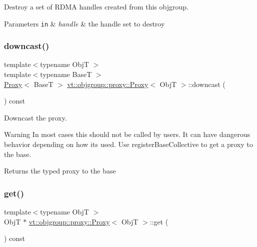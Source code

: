 Destroy a set of R\+D\+MA handles created from this objgroup. 


\begin{DoxyParams}[1]{Parameters}
\mbox{\tt in}  & {\em handle} & the handle set to destroy \\
\hline
\end{DoxyParams}
\mbox{\label{structvt_1_1objgroup_1_1proxy_1_1_proxy_ae672794dc83491200d7f6e794865a6bc}} 
\subsubsection{\texorpdfstring{downcast()}{downcast()}}
{\footnotesize\ttfamily template$<$typename ObjT $>$ \\
template$<$typename BaseT $>$ \\
\hyperlink{structvt_1_1objgroup_1_1proxy_1_1_proxy}{Proxy}$<$ BaseT $>$ \hyperlink{structvt_1_1objgroup_1_1proxy_1_1_proxy}{vt\+::objgroup\+::proxy\+::\+Proxy}$<$ ObjT $>$\+::downcast (\begin{DoxyParamCaption}{ }\end{DoxyParamCaption}) const}



Downcast the proxy. 

\begin{DoxyWarning}{Warning}
In most cases this should not be called by users. It can have dangerous behavior depending on how its used. Use {\ttfamily register\+Base\+Collective} to get a proxy to the base.
\end{DoxyWarning}
\begin{DoxyReturn}{Returns}
the typed proxy to the base 
\end{DoxyReturn}
\mbox{\label{structvt_1_1objgroup_1_1proxy_1_1_proxy_a62eef779c097c8398e249827e4ad7c6a}} 
\subsubsection{\texorpdfstring{get()}{get()}}
{\footnotesize\ttfamily template$<$typename ObjT $>$ \\
ObjT $\ast$ \hyperlink{structvt_1_1objgroup_1_1proxy_1_1_proxy}{vt\+::objgroup\+::proxy\+::\+Proxy}$<$ ObjT $>$\+::get (\begin{DoxyParamCaption}{ }\end{DoxyParamCaption}) const}



